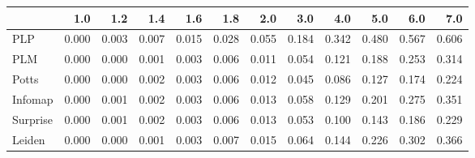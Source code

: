 \begin{tabular}{lrrrrrrrrrrr}
\toprule
{} &   1.0 &   1.2 &   1.4 &   1.6 &   1.8 &   2.0 &   3.0 &   4.0 &   5.0 &   6.0 &   7.0 \\
\midrule
PLP      & 0.000 & 0.003 & 0.007 & 0.015 & 0.028 & 0.055 & 0.184 & 0.342 & 0.480 & 0.567 & 0.606 \\
PLM      & 0.000 & 0.000 & 0.001 & 0.003 & 0.006 & 0.011 & 0.054 & 0.121 & 0.188 & 0.253 & 0.314 \\
Potts    & 0.000 & 0.000 & 0.002 & 0.003 & 0.006 & 0.012 & 0.045 & 0.086 & 0.127 & 0.174 & 0.224 \\
Infomap  & 0.000 & 0.001 & 0.002 & 0.003 & 0.006 & 0.013 & 0.058 & 0.129 & 0.201 & 0.275 & 0.351 \\
Surprise & 0.000 & 0.001 & 0.002 & 0.003 & 0.006 & 0.013 & 0.053 & 0.100 & 0.143 & 0.186 & 0.229 \\
Leiden   & 0.000 & 0.000 & 0.001 & 0.003 & 0.007 & 0.015 & 0.064 & 0.144 & 0.226 & 0.302 & 0.366 \\
\bottomrule
\end{tabular}
